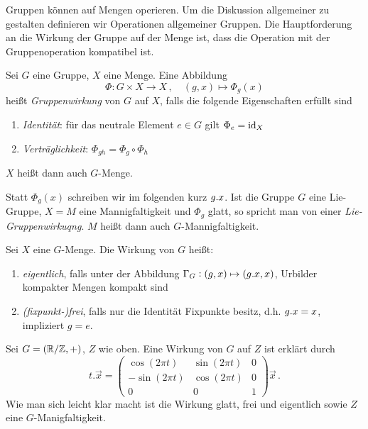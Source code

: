 Gruppen können auf Mengen operieren.  Um die Diskussion allgemeiner zu gestalten definieren wir
Operationen allgemeiner Gruppen. Die Hauptforderung an die Wirkung der Gruppe
auf der Menge ist, dass die Operation mit der Gruppenoperation kompatibel ist.
 \begin{definition}[Gruppenwirkung]
Sei $G$ eine Gruppe, $X$ eine Menge. Eine Abbildung
\begin{equation}
\Phi:G\times X\to X\,,\quad (g,x)\mapsto\Phi_g(x)
\end{equation}
heißt \emph{Gruppenwirkung} von $G$ auf $X$, falls die folgende Eigenschaften
erfüllt sind
\begin{enumerate}
  \item \emph{Identität}: für das neutrale Element $e\in G$ gilt
  $\displaystyle\Phi_e=\operatorname{id}_X$
  \item \emph{Verträglichkeit}: $\displaystyle\Phi_{gh}=\Phi_g\circ\Phi_h$
\end{enumerate}
$X$ heißt dann auch $G$-Menge.
\end{definition}
 Statt $\Phi_g(x)$ schreiben wir im folgenden kurz $g. x$.
Ist die Gruppe $G$ eine Lie-Gruppe, $X=M$ eine Mannigfaltigkeit und $\Phi_g$
 glatt, so spricht man von einer \emph{Lie-Gruppenwirkuqng}. $M$ heißt dann auch
 $G$-Mannigfaltigkeit.
 \begin{definition}
 Sei $X$ eine $G$-Menge. Die Wirkung von $G$ heißt:
 \begin{enumerate}
   \item \emph{eigentlich}, falls unter der Abbildung $\Gamma_G:(g,x)\mapsto (g
   . x,x)$, Urbilder kompakter Mengen kompakt sind
   \item \emph{(fixpunkt-)frei}, falls nur die Identität Fixpunkte besitz, d.h.
   $g. x=x$, impliziert $g=e$.
 \end{enumerate}
 \end{definition}
 \begin{beispiel}
Sei $G=(\mathbb{R}/\mathbb{Z},+)$, $Z$ wie oben. Eine Wirkung von $G$ auf $Z$ ist
erklärt durch
\begin{equation}
t.\vec{x}= \begin{pmatrix}
\cos\left( 2\pi t\right)&\sin\left( 2\pi t\right)&0\\
-\sin\left( 2\pi t\right)&\cos\left( 2\pi t\right)&0\\
0&0&1
\end{pmatrix}\vec{x}\,.
\end{equation}
Wie man sich leicht klar macht ist die Wirkung glatt, frei und eigentlich sowie 
$Z$ eine $G$-Manigfaltigkeit.
\end{beispiel}
